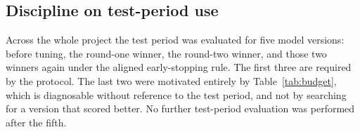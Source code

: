 \subsection{Discipline on test-period use}

Across the whole project the test period was evaluated for five model versions: before
tuning, the round-one winner, the round-two winner, and those two winners again under the
aligned early-stopping rule. The first three are required by the protocol. The last two
were motivated entirely by Table~\ref{tab:budget}, which is diagnosable without reference
to the test period, and not by searching for a version that scored better. No further
test-period evaluation was performed after the fifth.
